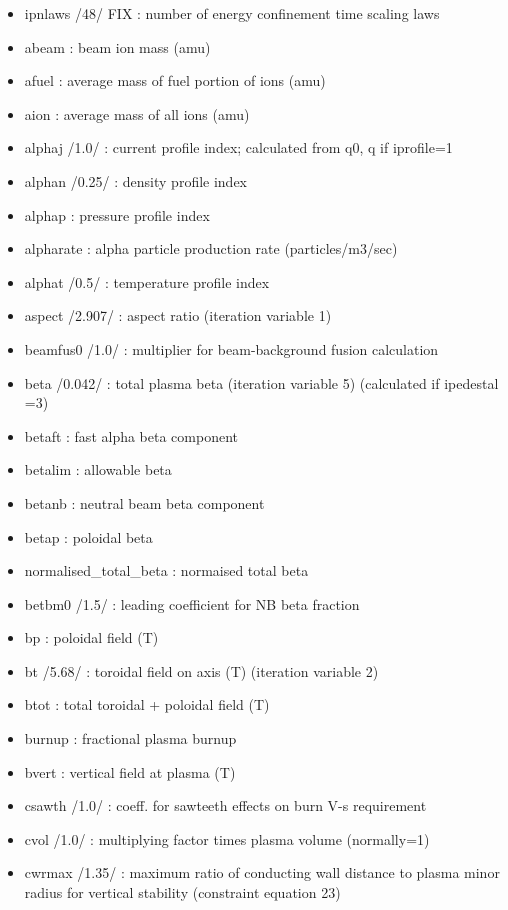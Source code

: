 \documentclass[]{article}
\providecommand{\tightlist}{%
  \setlength{\itemsep}{0pt}\setlength{\parskip}{0pt}}
\begin{document}
\begin{itemize}
\tightlist
\item
  ipnlaws /48/ FIX : number of energy confinement time scaling laws
\item
  abeam : beam ion mass (amu)
\item
  afuel : average mass of fuel portion of ions (amu)
\item
  aion : average mass of all ions (amu)
\item
  alphaj /1.0/ : current profile index; calculated from q0, q if
  iprofile=1
\item
  alphan /0.25/ : density profile index
\item
  alphap : pressure profile index
\item
  alpharate : alpha particle production rate (particles/m3/sec)
\item
  alphat /0.5/ : temperature profile index
\item
  aspect /2.907/ : aspect ratio (iteration variable 1)
\item
  beamfus0 /1.0/ : multiplier for beam-background fusion calculation
\item
  beta /0.042/ : total plasma beta (iteration variable 5) (calculated if
  ipedestal =3)
\item
  betaft : fast alpha beta component
\item
  betalim : allowable beta
\item
  betanb : neutral beam beta component
\item
  betap : poloidal beta
\item
  normalised\_total\_beta : normaised total beta
\item
  betbm0 /1.5/ : leading coefficient for NB beta fraction
\item
  bp : poloidal field (T)
\item
  bt /5.68/ : toroidal field on axis (T) (iteration variable 2)
\item
  btot : total toroidal + poloidal field (T)
\item
  burnup : fractional plasma burnup
\item
  bvert : vertical field at plasma (T)
\item
  csawth /1.0/ : coeff. for sawteeth effects on burn V-s requirement
\item
  cvol /1.0/ : multiplying factor times plasma volume (normally=1)
\item
  cwrmax /1.35/ : maximum ratio of conducting wall distance to plasma
  minor radius for vertical stability (constraint equation 23)

\end{itemize}
\end{document}
